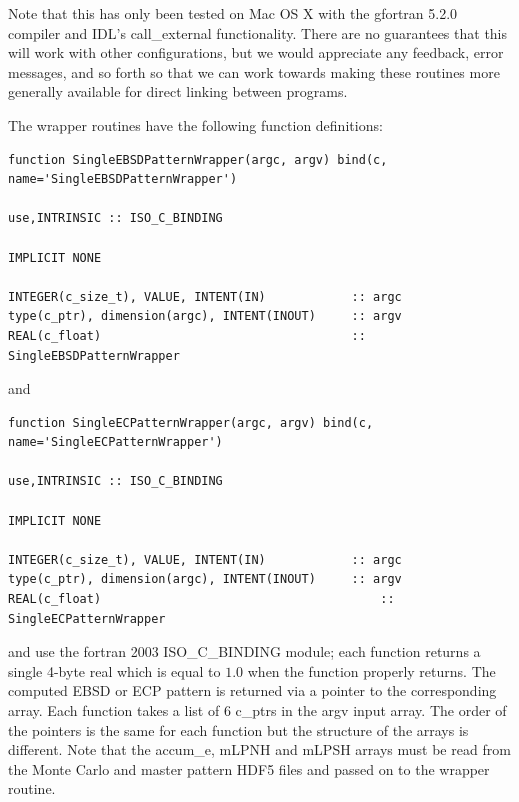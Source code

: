 \documentclass[DIV=calc, paper=letter, fontsize=11pt]{scrartcl}	 %
\begin{document}
Note that this has only been tested on Mac OS X with the gfortran 5.2.0 compiler and IDL's \textsf{call\_external} functionality.
There are no guarantees that this will work with other configurations, but we would appreciate any feedback, error messages, and
so forth so that we can work towards making these routines more generally available for direct linking between programs.

The wrapper routines have the following function definitions:
\begin{verbatim}
function SingleEBSDPatternWrapper(argc, argv) bind(c, name='SingleEBSDPatternWrapper') 

use,INTRINSIC :: ISO_C_BINDING

IMPLICIT NONE

INTEGER(c_size_t), VALUE, INTENT(IN)            :: argc 
type(c_ptr), dimension(argc), INTENT(INOUT)     :: argv
REAL(c_float)                                   :: SingleEBSDPatternWrapper
\end{verbatim}
and
\begin{verbatim}
function SingleECPatternWrapper(argc, argv) bind(c, name='SingleECPatternWrapper') 
	
use,INTRINSIC :: ISO_C_BINDING

IMPLICIT NONE

INTEGER(c_size_t), VALUE, INTENT(IN)            :: argc 
type(c_ptr), dimension(argc), INTENT(INOUT)     :: argv
REAL(c_float)                                  		:: SingleECPatternWrapper
\end{verbatim}
and use the fortran 2003 \textsf{ISO\_C\_BINDING} module; each function returns a single 4-byte real which is equal to $1.0$ when the 
function properly returns.  The computed 
EBSD or ECP pattern is returned via a pointer to the corresponding array.  Each function takes a list of $6$ \textsf{c\_ptr}s
in the \textsf{argv} input array.  The order of the pointers is the same for each function but the structure of the arrays is different.  Note that
the \textsf{accum\_e}, \textsf{mLPNH} and \textsf{mLPSH} arrays must be read from the Monte Carlo and master pattern HDF5 files and
passed on to the wrapper routine. 
\end{document}
